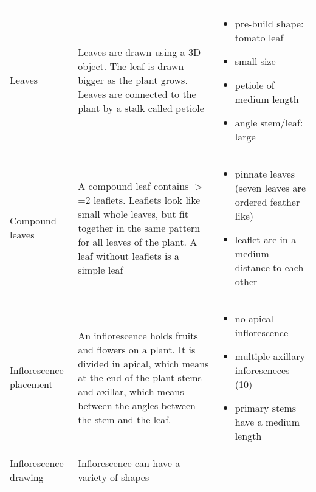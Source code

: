\begin{longtable}[c]{@{}p{}p{}p{}@{}}
	Leaves                  & Leaves are drawn using a 3D-object. The leaf is drawn bigger as the plant grows. Leaves are connected to the plant by a stalk called petiole& \vspace{-25pt}
	\begin{itemize}
		\item pre-build shape: tomato leaf\vspace{-10pt}
		\item small size \vspace{-10pt}
		\item petiole of medium length \vspace{-10pt}
		\item angle stem/leaf: large \vspace{-10pt}
	\end{itemize} \\
	Compound leaves         & A compound leaf contains $>$=2 leaflets. Leaflets look like small whole leaves, but fit together in the same pattern for all leaves of the plant. A leaf without leaflets is a simple leaf & \vspace{-25pt}
	\begin{itemize}
		\item pinnate leaves (seven leaves are ordered feather like) \vspace{-10pt}
		\item leaflet are in a medium distance to each other \vspace{-10pt}
	\end{itemize} \\
	Inflorescence placement & An inflorescence holds fruits and flowers on a plant. It is divided in apical, which means at the end of the plant stems and axillar, which means between the angles between the stem and the leaf.         & \vspace{-25pt}
	\begin{itemize}
		\item no apical inflorescence \vspace{-10pt}
		\item multiple axillary inforescneces (10)\vspace{-10pt}
		\item primary stems have a medium length\vspace{-10pt}
	\end{itemize} \\
	Inflorescence drawing   & Inflorescence can have a variety of shapes                                                                                                                                                                                  & \vspace{-25pt}

\end{longtable}
